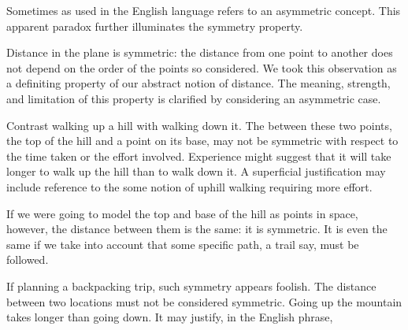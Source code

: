 
\sbasic



\sstart



Sometimes 
as used in the English language
refers to an asymmetric  concept.
This apparent paradox further
illuminates the symmetry property.


Distance in the plane is
symmetric: the distance from
one point to another does
not depend on the order of the
points so considered.
We took this observation as
a definiting property
of our abstract notion
of distance.
The meaning, strength, and
limitation of
this property
is clarified by considering an
asymmetric case.

Contrast walking up a hill
with walking down it.
The  between these
two points, the top of the hill
and a point on its base,
may not be symmetric with respect to
the time taken or the effort involved.
Experience might suggest
that it will take longer
to walk up the hill
than to walk down it.
A superficial justification may
include reference to the some
notion of uphill walking requiring
more effort.

If we were going to model the top and
base of the hill
as points in space, however, the
distance between them is the same: it
is symmetric.
It is even the same if we take into
account that some specific path, a trail
say, must be followed.

If planning a backpacking trip,
such symmetry appears foolish.
The distance between two
locations must not be considered
symmetric.
Going up the mountain takes longer
than going down.
It may justify, in the English
phrase, 


\strats
